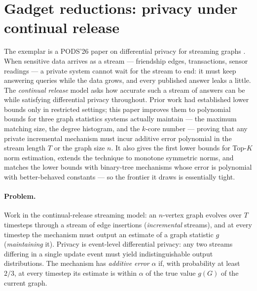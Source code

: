 \section{Gadget reductions: privacy under continual release}
\label{sec:red-continual}

The exemplar is a PODS'26 paper on differential privacy for streaming graphs
\citep{sigmod26-136}\pods. When sensitive data arrives as a stream --- friendship edges,
transactions, sensor readings --- a private system cannot wait for the stream to end:
it must keep answering queries while the data grows, and every published answer leaks
a little. The \emph{continual release} model asks how accurate such a stream of answers
can be while satisfying differential privacy throughout. Prior work had established
lower bounds only in restricted settings; this paper improves them to polynomial bounds
for three graph statistics systems actually maintain --- the maximum matching size, the
degree histogram, and the $k$-core number --- proving that any private incremental
mechanism must incur additive error polynomial in the stream length $T$ or the graph
size $n$. It also gives the first lower bounds for Top-$K$ norm estimation, extends the
technique to monotone symmetric norms, and matches the lower bounds with binary-tree
mechanisms whose error is polynomial with better-behaved constants --- so the frontier
it draws is essentially tight.

\paragraph{Problem.}
Work in the continual-release streaming model: an $n$-vertex graph evolves over $T$
timesteps through a stream of edge insertions (\emph{incremental} streams), and at every
timestep the mechanism must output an estimate of a graph statistic $g$
(\emph{maintaining} it). Privacy is event-level differential privacy: any two streams
differing in a single update event must yield indistinguishable output distributions.
The mechanism has \emph{additive error} $\alpha$ if, with probability at least $2/3$,
at every timestep its estimate is within $\alpha$ of the true value $g(G)$ of the
current graph.


